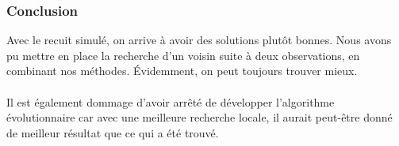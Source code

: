 \documentclass{beamer}
\begin{document}
\begin{frame}
    \frametitle{Conclusion}
    Avec le recuit simulé, on arrive à avoir des solutions plutôt bonnes. Nous avons pu mettre en place la recherche d'un voisin suite à deux observations, en combinant nos méthodes. Évidemment, on peut toujours trouver mieux.  \\~\\
    Il est également dommage d'avoir arrêté de développer l'algorithme évolutionnaire car avec une meilleure recherche locale, il aurait peut-être donné de meilleur résultat que ce qui a été trouvé. 
\end{frame}
\end{document}
